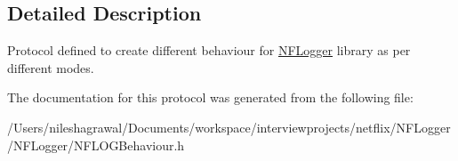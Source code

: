 \subsection{Detailed Description}
Protocol defined to create different behaviour for \hyperlink{interface_n_f_logger}{N\+F\+Logger} library as per different modes. 

The documentation for this protocol was generated from the following file\+:\begin{DoxyCompactItemize}
\item 
/\+Users/nileshagrawal/\+Documents/workspace/interviewprojects/netflix/\+N\+F\+Logger/\+N\+F\+Logger/N\+F\+L\+O\+G\+Behaviour.\+h\end{DoxyCompactItemize}
